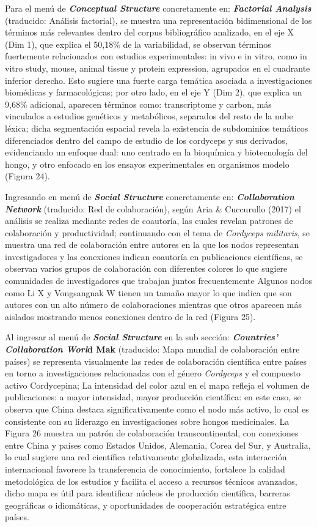 \documentclass[
  spanish,
  letterpaper,
  DIV=11,
  numbers=noendperiod]{scrreprt}
\begin{document}
Para el menú de \textbf{\emph{Conceptual Structure}} concretamente en:
\textbf{\emph{Factorial Analysis}} (traducido: Análisis factorial), se
muestra una representación bidimensional de los términos más relevantes
dentro del corpus bibliográfico analizado, en el eje X (Dim 1), que
explica el 50,18\% de la variabilidad, se observan términos fuertemente
relacionados con estudios experimentales: in vivo e in vitro, como in
vitro study, mouse, animal tissue y protein expression, agrupados en el
cuadrante inferior derecho. Esto sugiere una fuerte carga temática
asociada a investigaciones biomédicas y farmacológicas; por otro lado,
en el eje Y (Dim 2), que explica un 9,68\% adicional, aparecen términos
como: transcriptome y carbon, más vinculados a estudios genéticos y
metabólicos, separados del resto de la nube léxica; dicha segmentación
espacial revela la existencia de subdominios temáticos diferenciados
dentro del campo de estudio de los cordyceps y sus derivados,
evidenciando un enfoque dual: uno centrado en la bioquímica y
biotecnología del hongo, y otro enfocado en los ensayos experimentales
en organismos modelo (Figura 24).

Ingresando en menú de \textbf{\emph{Social Structure}} concretamente en:
\textbf{\emph{Collaboration Network}} (traducido: Red de colaboración),
según Aria \& Cuccurullo (2017) el análisis se realiza mediante redes de
coautoría, las cuales revelan patrones de colaboración y productividad;
continuando con el tema de \emph{Cordyceps militaris}, se muestra una
red de colaboración entre autores en la que los nodos representan
investigadores y las conexiones indican coautoría en publicaciones
científicas, se observan varios grupos de colaboración con diferentes
colores lo que sugiere comunidades de investigadores que trabajan juntos
frecuentemente Algunos nodos como Li X y Vongsangnak W tienen un tamaño
mayor lo que indica que son autores con un alto número de colaboraciones
mientras que otros aparecen más aislados mostrando menos conexiones
dentro de la red (Figura 25).

Al ingresar al menú de \textbf{\emph{Social Structure}} en la sub
sección: \textbf{\emph{Countries' Collaboration Worl}d Mak} (traducido:
Mapa mundial de colaboración entre países) se representa visualmente las
redes de colaboración científica entre países en torno a investigaciones
relacionadas con el género \emph{Cordyceps} y el compuesto activo
Cordycepina; La intensidad del color azul en el mapa refleja el volumen
de publicaciones: a mayor intensidad, mayor producción científica: en
este caso, se observa que China destaca significativamente como el nodo
más activo, lo cual es consistente con su liderazgo en investigaciones
sobre hongos medicinales. La Figura 26 muestra un patrón de colaboración
transcontinental, con conexiones entre China y países como Estados
Unidos, Alemania, Corea del Sur, y Australia, lo cual sugiere una red
científica relativamente globalizada, esta interacción internacional
favorece la transferencia de conocimiento, fortalece la calidad
metodológica de los estudios y facilita el acceso a recursos técnicos
avanzados, dicho mapa es útil para identificar núcleos de producción
científica, barreras geográficas o idiomáticas, y oportunidades de
cooperación estratégica entre países.
\end{document}
